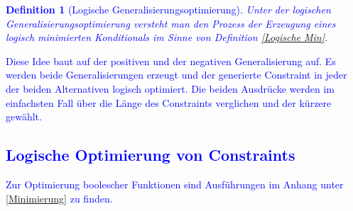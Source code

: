 \documentclass[a4paper, 11pt]{book}
\newtheorem{Def}{Definition }[section]
\begin{document}
\textcolor{blue}{
\begin{Def}[Logische Generalisierungsoptimierung]\label{Logische Genopt}
	Unter der logischen Generalisierungsoptimierung versteht man den Prozess der Erzeugung eines logisch minimierten Konditionals im Sinne von Definition \ref{Logische Min}.
\end{Def}
Diese Idee baut auf der positiven und der negativen Generalisierung auf. Es werden beide Generalisierungen erzeugt und der generierte Constraint in jeder der beiden Alternativen logisch optimiert. Die beiden Ausdrücke werden im einfachsten Fall über die Länge des Constraints verglichen und der kürzere gewählt.\\
\subsection{Logische Optimierung von Constraints} \label{LogOpt}
Zur Optimierung boolescher Funktionen sind Ausführungen im Anhang unter \ref{Minimierung} zu finden.
}
\end{document}
